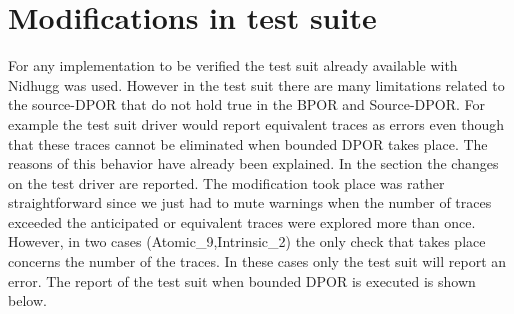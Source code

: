 \section{Modifications in test suite}
For any implementation to be verified the test suit already available with Nidhugg was used. However in the test suit there are many limitations related to the source-DPOR
that do not hold true in the BPOR and Source-DPOR. For example the test suit driver would report equivalent traces as errors even though that these traces cannot be eliminated 
when bounded DPOR takes place. The reasons of this behavior have already been explained. In the section the changes on the test driver are reported.
The modification took place was rather straightforward since we just had to mute warnings when the number of traces exceeded the anticipated or equivalent traces were explored more than
once. However, in two cases (Atomic\_9,Intrinsic\_2) the only check that takes place concerns the number of the traces. In these cases only the test suit will report an error. 
The report of the test suit when bounded DPOR is executed is shown below.

